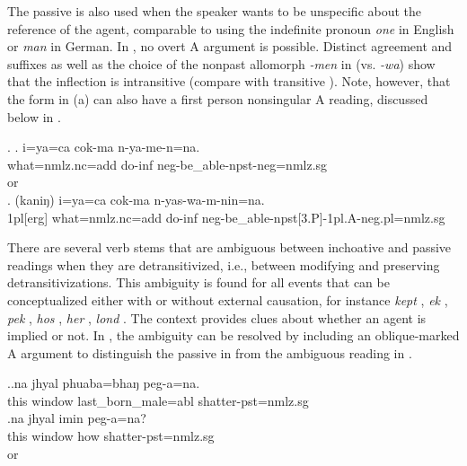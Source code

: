 The passive is also used when the speaker wants to be unspecific about the reference of the agent, comparable to using the indefinite pronoun \emph{one} in English or \emph{man} in German. In  \Next[a], no overt A argument is possible. Distinct agreement and  suffixes as well as the choice of the nonpast allomorph \emph{-men} in \Next[a] (vs.  \emph{-wa}) show that the inflection is intransitive (compare with transitive \Next[b]). Note, however, that the form in (a) can also have a first person nonsingular A reading, discussed below in .

\ex. \ag. i=ya=ca cok-ma n-ya-me-n=na.\\
what{\sc =nmlz.nc=add} do{\sc -inf} {\sc neg-}be\_able{\sc [3sg]-npst-neg=nmlz.sg}\\
 or\\
\bg. (kaniŋ) i=ya=ca cok-ma n-yas-wa-m-nin=na.\\
{\sc 1pl[erg]} what{\sc =nmlz.nc=add} do{\sc -inf} {\sc neg-}be\_able{\sc -npst[3.P]-1pl.A-neg.pl=nmlz.sg}\\ 


There are several verb stems that are ambiguous between inchoative and passive readings when they are detransitivized, i.e., between  modifying and  preserving detransitivizations. This ambiguity is found for all events that can be conceptualized either with or without external causation, for instance \emph{kept} , \emph{ek} ,  \emph{pek} , \emph{hos} , \emph{her} , \emph{lond} . The context provides clues about whether an agent is implied or not. In \Next, the ambiguity can be resolved by including an oblique-marked A argument to distinguish the passive in \Next[a] from the ambiguous reading in \Next[b]. 

\ex.\ag.na jhyal phuaba=bhaŋ peg-a=na.\\
this window  last\_born\_male{\sc =abl}  shatter{\sc [3sg]-pst=nmlz.sg}\\
\bg.na jhyal imin peg-a=na?\\
this window how shatter{\sc [3sg]-pst=nmlz.sg}\\
 or \\

